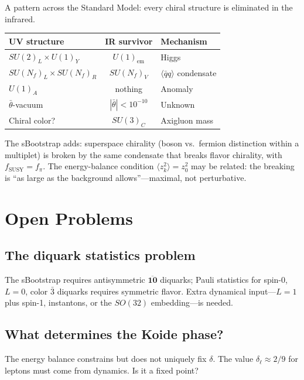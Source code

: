 \documentclass[12pt,a4paper]{article}
\newcommand{\qqbar}{\langle\bar{q}q\rangle}
\begin{document}
A pattern across the Standard Model: every chiral structure is 
eliminated in the infrared.

\begin{center}
\begin{tabular}{lcl}
\toprule
UV structure & IR survivor & Mechanism \\
\midrule
$SU(2)_L \times U(1)_Y$ & $U(1)_{\text{em}}$ & Higgs \\
$SU(N_f)_L \times SU(N_f)_R$ & $SU(N_f)_V$ & $\qqbar$ condensate \\
$U(1)_A$ & nothing & Anomaly \\
$\bar{\theta}$-vacuum & $|\bar{\theta}| < 10^{-10}$ & Unknown \\
Chiral color? & $SU(3)_C$ & Axigluon mass \\
\bottomrule
\end{tabular}
\end{center}

The sBootstrap adds: superspace chirality (boson vs.\ fermion 
distinction within a multiplet) is broken by the same condensate 
that breaks flavor chirality, with $f_{\text{SUSY}} = f_\pi$. The 
energy-balance condition $\langle z_k^2\rangle = z_0^2$ may be 
related: the breaking is ``as large as the background 
allows''---maximal, not perturbative.

\section{Open Problems}
\label{sec:open}

\subsection{The diquark statistics problem}
The sBootstrap requires antisymmetric $\overline{\mathbf{10}}$ 
diquarks; Pauli statistics for spin-0, $L=0$, color $\bar{3}$ 
diquarks requires symmetric flavor. Extra dynamical input---$L=1$ 
plus spin-1, instantons, or the $SO(32)$ embedding---is needed.

\subsection{What determines the Koide phase?}
The energy balance constrains but does not uniquely fix $\delta$. 
The value $\delta_\ell \approx 2/9$ for leptons must come from 
dynamics. Is it a fixed point?
\end{document}
